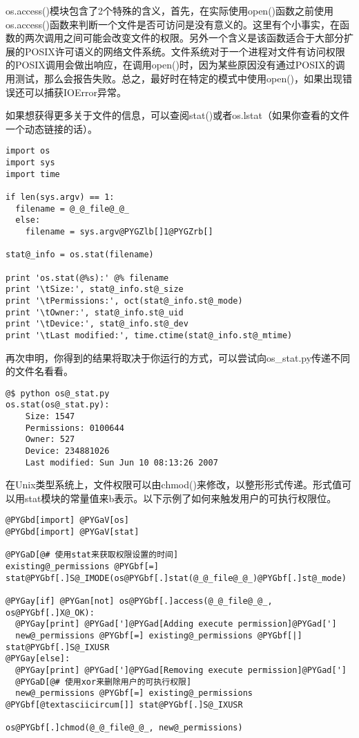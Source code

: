\documentclass[letterpaper,10pt,english]{manual}
\begin{document}
os.access()模块包含了2个特殊的含义，首先，在实际使用open()函数之前使用os.access()函数来判断一个文件是否可访问是没有意义的。这里有个小事实，在函数的两次调用之间可能会改变文件的权限。另外一个含义是该函数适合于大部分扩展的POSIX许可语义的网络文件系统。文件系统对于一个进程对文件有访问权限的POSIX调用会做出响应，在调用open()时，因为某些原因没有通过POSIX的调用测试，那么会报告失败。总之，最好时在特定的模式中使用open()，如果出现错误还可以捕获IOError异常。

如果想获得更多关于文件的信息，可以查阅stat()或者os.lstat（如果你查看的文件一个动态链接的话）。

\begin{Verbatim}[commandchars=@\[\]]
import os
import sys
import time

if len(sys.argv) == 1:
  filename = @_@_file@_@_
  else:
    filename = sys.argv@PYGZlb[]1@PYGZrb[]

stat@_info = os.stat(filename)

print 'os.stat(@%s):' @% filename
print '\tSize:', stat@_info.st@_size
print '\tPermissions:', oct(stat@_info.st@_mode)
print '\tOwner:', stat@_info.st@_uid
print '\tDevice:', stat@_info.st@_dev
print '\tLast modified:', time.ctime(stat@_info.st@_mtime)
\end{Verbatim}

再次申明，你得到的结果将取决于你运行的方式，可以尝试向os\_stat.py传递不同的文件名看看。

\begin{Verbatim}[commandchars=@\[\]]
@$ python os@_stat.py
os.stat(os@_stat.py):
    Size: 1547
    Permissions: 0100644
    Owner: 527
    Device: 234881026
    Last modified: Sun Jun 10 08:13:26 2007
\end{Verbatim}

在Unix类型系统上，文件权限可以由chmod()来修改，以整形形式传递。形式值可以用stat模块的常量值来b表示。以下示例了如何来触发用户的可执行权限位。

\begin{Verbatim}[commandchars=@\[\]]
@PYGbd[import] @PYGaV[os]
@PYGbd[import] @PYGaV[stat]

@PYGaD[@# 使用stat来获取权限设置的时间]
existing@_permissions @PYGbf[=] stat@PYGbf[.]S@_IMODE(os@PYGbf[.]stat(@_@_file@_@_)@PYGbf[.]st@_mode)

@PYGay[if] @PYGan[not] os@PYGbf[.]access(@_@_file@_@_, os@PYGbf[.]X@_OK):
  @PYGay[print] @PYGad[']@PYGad[Adding execute permission]@PYGad[']
  new@_permissions @PYGbf[=] existing@_permissions @PYGbf[|] stat@PYGbf[.]S@_IXUSR
@PYGay[else]:
  @PYGay[print] @PYGad[']@PYGad[Removing execute permission]@PYGad[']
  @PYGaD[@# 使用xor来删除用户的可执行权限]
  new@_permissions @PYGbf[=] existing@_permissions @PYGbf[@textasciicircum[]] stat@PYGbf[.]S@_IXUSR

os@PYGbf[.]chmod(@_@_file@_@_, new@_permissions)
\end{Verbatim}
\end{document}
